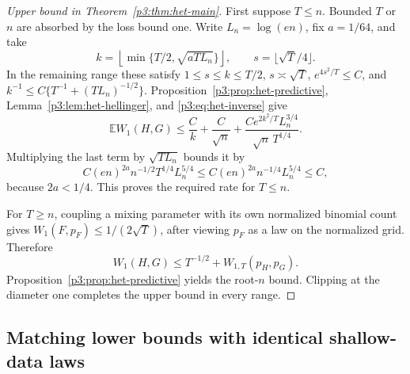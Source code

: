 \documentclass[11pt,a4paper]{article}
\theoremstyle{definition}
\theoremstyle{remark}
\numberwithin{equation}{section}
\begin{document}
\begin{proof}[Upper bound in Theorem~\ref{p3:thm:het-main}]
First suppose $T\le n$.  Bounded $T$ or $n$ are absorbed by the loss bound
one.  Write $L_n=\log(en)$, fix $a=1/64$, and take
\[
 k=\left\lfloor\min\{T/2,\sqrt{aTL_n}\}\right\rfloor,
 \qquad s=\lfloor\sqrt T/4\rfloor.
\]
In the remaining range these satisfy $1\le s\le k\le T/2$,
$s\asymp\sqrt T$, $e^{4s^2/T}\le C$, and
$k^{-1}\le C\{T^{-1}+(TL_n)^{-1/2}\}$.
Proposition~\ref{p3:prop:het-predictive}, Lemma~\ref{p3:lem:het-hellinger},
and \eqref{p3:eq:het-inverse} give
\[
 \mathbb EW_1(H,G)
 \le\frac Ck+\frac C{\sqrt n}
       +\frac{Ce^{2k^2/T}L_n^{3/4}}{\sqrt n\,T^{1/4}}.
\]
Multiplying the last term by $\sqrt{TL_n}$ bounds it by
\[
 C(en)^{2a}n^{-1/2}T^{1/4}L_n^{5/4}
       \le C(en)^{2a}n^{-1/4}L_n^{5/4}\le C,
\]
because $2a<1/4$.  This proves the required rate for $T\le n$.

For $T\ge n$, coupling a mixing parameter with its own normalized
binomial count gives $W_1(F,p_F)\le1/(2\sqrt T)$, after viewing $p_F$
as a law on the normalized grid.  Therefore
\[
 W_1(H,G)\le T^{-1/2}+W_{1,T}(p_H,p_G).
\]
Proposition~\ref{p3:prop:het-predictive} yields the root-$n$ bound.
Clipping at the diameter one completes the upper bound in every range.
\end{proof}

\subsection{Matching lower bounds with identical shallow-data laws}
\end{document}
